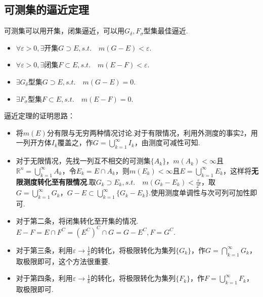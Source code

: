 \documentclass[bwprint, withoutpreface]{cumcmthesis}
\begin{document}
\subsection{可测集的逼近定理}
\indent 可测集可以用开集，闭集逼近，可以用$G_{\delta},F_{\sigma}$型集最佳逼近.

\begin{itemize}[itemindent=2em]
	\item $\forall \varepsilon > 0, \exists \mbox{开集}G \supset E, s.t. \quad m(G - E) < \varepsilon$.
	\item $\forall \varepsilon > 0, \exists \mbox{闭集}F \subset E, s.t. \quad m(E - F) < \varepsilon$.
	\item $\exists G_{\delta} \mbox{型集} G \supset E, s.t. \quad m(G - E) = 0$.
	\item $\exists F_{\sigma} \mbox{型集} F \subset E, s.t. \quad m(E - F) = 0$.
\end{itemize}

逼近定理的证明思路：
\begin{itemize}[itemindent=2em]
	\item 将$m(E)$分有限与无穷两种情况讨论.对于有限情况，利用外测度的事实2，用一列开方体${I_k}$覆盖之，作$G = \bigcup_{k = 1}^{\infty}{I_k}$，由测度可减性可知.
	\item 对于无限情况，先找一列互不相交的可测集$\{A_k\}$，$m(A_k) < \infty$且$\mathbb{R}^n = \bigcup_{k = 1}^{\infty}{A_k}$，令$E_k = E \cap A_k$，则$m(E_k) < \infty$且$E = \bigcup_{k = 1}^{\infty}{E_k}$，这样将\textbf{无限测度转化至有限情况}.取$G_k \supset E_k, s.t.\quad m(G_k - E_k) < \frac{\varepsilon}{2^k}$，取$G = \bigcup_{k = 1}^{\infty}{G_k}$，$G - E \subset \bigcup_{k = 1}^{\infty}\{G_k - E_k\}$.使用测度单调性与次可列可加性即可.
	\item 对于第二条，将闭集转化至开集的情况.$E - F = E \cap F^C = {(E^C)}^C \cap G = G - E^C, F = G^C$.
	\item 对于第三条，利用$\varepsilon \to \frac{1}{k}$的转化，将极限转化为集列$\{G_k\}$，作$G = \bigcap_{k = 1}^{\infty}{G_k}$，取极限即可，这个方法很重要.
	\item 对于第四条，利用$\varepsilon \to \frac{1}{k}$的转化，将极限转化为集列$\{F_k\}$，作$F = \bigcup_{k = 1}^{\infty}{F_k}$，取极限即可.
\end{itemize}

\begin{center}
\end{center}
\end{document}
